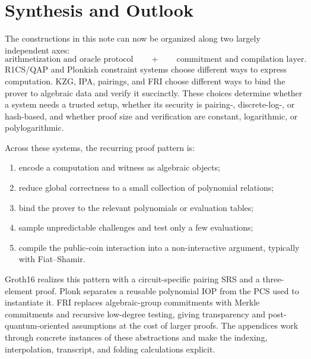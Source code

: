 \section{Synthesis and Outlook}
\label{sec:synthesis}

The constructions in this note can now be organized along two largely independent axes:
\[
\boxed{\text{arithmetization and oracle protocol}}
\qquad+\qquad
\boxed{\text{commitment and compilation layer}}.
\]
R1CS/QAP and Plonkish constraint systems choose different ways to express computation. KZG, IPA, pairings, and FRI choose different ways to bind the prover to algebraic data and verify it succinctly. These choices determine whether a system needs a trusted setup, whether its security is pairing-, discrete-log-, or hash-based, and whether proof size and verification are constant, logarithmic, or polylogarithmic.

Across these systems, the recurring proof pattern is:
\begin{enumerate}[leftmargin=2em]
    \item encode a computation and witness as algebraic objects;
    \item reduce global correctness to a small collection of polynomial relations;
    \item bind the prover to the relevant polynomials or evaluation tables;
    \item sample unpredictable challenges and test only a few evaluations;
    \item compile the public-coin interaction into a non-interactive argument, typically with Fiat--Shamir.
\end{enumerate}

Groth16 realizes this pattern with a circuit-specific pairing SRS and a three-element proof. Plonk separates a reusable polynomial IOP from the PCS used to instantiate it. FRI replaces algebraic-group commitments with Merkle commitments and recursive low-degree testing, giving transparency and post-quantum-oriented assumptions at the cost of larger proofs. The appendices work through concrete instances of these abstractions and make the indexing, interpolation, transcript, and folding calculations explicit.
